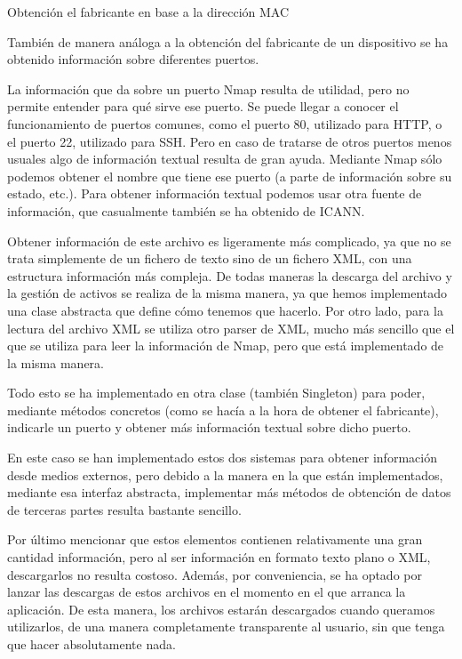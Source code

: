 \begin{code}
	\caption{Obtención el fabricante en base a la dirección MAC}
	\label{code:getVendor}
	
\end{code}

También de manera análoga a la obtención del fabricante de un dispositivo se ha obtenido información sobre diferentes puertos.

La información que da sobre un puerto Nmap resulta de utilidad, pero no permite entender para qué sirve ese puerto. Se puede llegar a conocer el funcionamiento de puertos comunes, como el puerto 80, utilizado para HTTP, o el puerto 22, utilizado para SSH. Pero en caso de tratarse de otros puertos menos usuales algo de información textual resulta de gran ayuda. Mediante Nmap sólo podemos obtener el nombre que tiene ese puerto (a parte de información sobre su estado, etc.). Para obtener información textual podemos usar otra fuente de información, que casualmente también se ha obtenido de ICANN. 

Obtener información de este archivo es ligeramente más complicado, ya que no se trata simplemente de un fichero de texto sino de un fichero XML, con una estructura información más compleja. De todas maneras la descarga del archivo y la gestión de activos se realiza de la misma manera, ya que hemos implementado una clase abstracta que define cómo tenemos que hacerlo. Por otro lado, para la lectura del archivo XML se utiliza otro parser de XML, mucho más sencillo que el que se utiliza para leer la información de Nmap, pero que está implementado de la misma manera.

Todo esto se ha implementado en otra clase (también Singleton) para poder, mediante métodos concretos (como se hacía a la hora de obtener el fabricante), indicarle un puerto y obtener más información textual sobre dicho puerto.

En este caso se han implementado estos dos sistemas para obtener información desde medios externos, pero debido a la manera en la que están implementados, mediante esa interfaz abstracta, implementar más métodos de obtención de datos de terceras partes resulta bastante sencillo.

Por último mencionar que estos elementos contienen relativamente una gran cantidad información, pero al ser información en formato texto plano o XML, descargarlos no resulta costoso. Además, por conveniencia, se ha optado por lanzar las descargas de estos archivos en el momento en el que arranca la aplicación. De esta manera, los archivos estarán descargados cuando queramos utilizarlos, de una manera completamente transparente al usuario, sin que tenga que hacer absolutamente nada.


